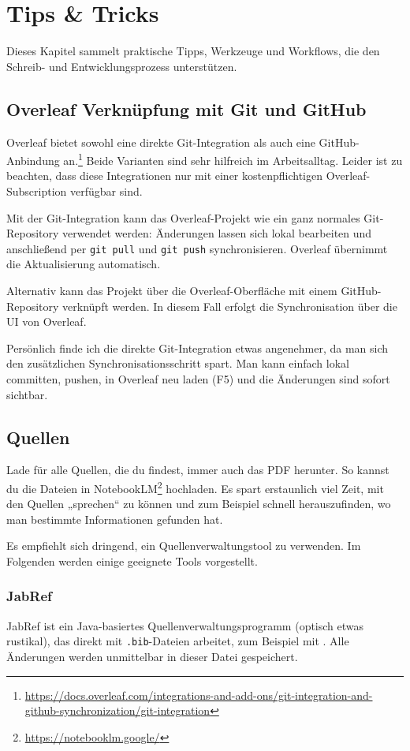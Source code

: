 \chapter{Tips \& Tricks}

Dieses Kapitel sammelt praktische Tipps, Werkzeuge und Workflows, die den Schreib- und Entwicklungsprozess unterstützen.

\section{Overleaf Verknüpfung mit Git und GitHub}
\label{sec:overleaf-git}

Overleaf bietet sowohl eine direkte Git-Integration als auch eine GitHub-Anbindung an.\footnote{\url{https://docs.overleaf.com/integrations-and-add-ons/git-integration-and-github-synchronization/git-integration}} Beide Varianten sind sehr hilfreich im Arbeitsalltag. Leider ist zu beachten, dass diese Integrationen nur mit einer kostenpflichtigen Overleaf-Subscription verfügbar sind.

Mit der Git-Integration kann das Overleaf-Projekt wie ein ganz normales Git-Repository verwendet werden: Änderungen lassen sich lokal bearbeiten und anschließend per \texttt{git pull} und \texttt{git push} synchronisieren. Overleaf übernimmt die Aktualisierung automatisch.

Alternativ kann das Projekt über die Overleaf-Oberfläche mit einem GitHub-Repository verknüpft werden. In diesem Fall erfolgt die Synchronisation über die UI von Overleaf.

Persönlich finde ich die direkte Git-Integration etwas angenehmer, da man sich den zusätzlichen Synchronisationsschritt spart. Man kann einfach lokal committen, pushen, in Overleaf neu laden (F5) und die Änderungen sind sofort sichtbar.

\section{Quellen}
Lade für alle Quellen, die du findest, immer auch das PDF herunter. So kannst du die Dateien in NotebookLM\footnote{\url{https://notebooklm.google/}} hochladen. Es spart erstaunlich viel Zeit, mit den Quellen „sprechen“ zu können und zum Beispiel schnell herauszufinden, wo man bestimmte Informationen gefunden hat.

Es empfiehlt sich dringend, ein Quellenverwaltungstool zu verwenden. Im Folgenden werden einige geeignete Tools vorgestellt.

\subsection{JabRef}
JabRef ist ein Java-basiertes Quellenverwaltungsprogramm (optisch etwas rustikal), das direkt mit \texttt{.bib}-Dateien arbeitet, zum Beispiel mit . Alle Änderungen werden unmittelbar in dieser Datei gespeichert.

